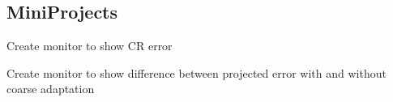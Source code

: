 \begin{refsection}
\section{MiniProjects}

Create monitor to show CR error

Create monitor to show difference between projected error with and without coarse adaptation

\printbibliography[heading=subbibliography] %
\end{refsection}
